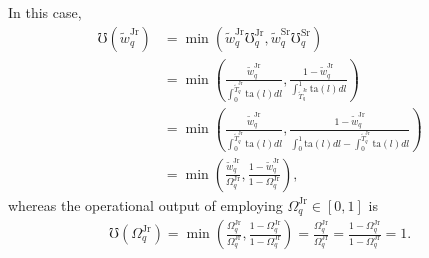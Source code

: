 \documentclass[hidelinks, nonatbib]{elsarticle}
\begin{document}
\begin{enumerate}
    In this case,
    \begin{align}
        \mho(\tilde{w}_{q}^{\text{Jr}})
        &=
        \min\left(
            \tilde{w}_{q}^{\text{Jr}}
            \mho_{q}^{\text{Jr}}
            ,
            \tilde{w}_{q}^{\text{Sr}}
            \mho_{q}^{\text{Sr}}
        \right)
        \\
        &=
        \min\left(
            \frac{
                \tilde{w}_{q}^{\text{Jr}}
            }{
                \int_{0}^{
                    \tilde{T}_{q}^{\text{Jr}}
                }{
                    \text{ta}(l)
                    dl
                }
            }
            ,
            \frac{
                1 - \tilde{w}_{q}^{\text{Jr}}
            }{
                \int_{
                    \tilde{T}_{q}^{\text{Jr}}
                }^{1}{
                    \text{ta}(l)
                    dl
                }
            }
        \right)
        \\
        &=
        \min\left(
            \frac{
                \tilde{w}_{q}^{\text{Jr}}
            }{
                \int_{0}^{
                    \tilde{T}_{q}^{\text{Jr}}
                }{
                    \text{ta}(l)
                    dl
                }
            }
            ,
            \frac{
                1 - \tilde{w}_{q}^{\text{Jr}}
            }{
                \int_{0}^{1}{
                    \text{ta}(l)
                    dl
                }
                -
                \int_{0}^{
                    \tilde{T}_{q}^{\text{Jr}}
                }{
                    \text{ta}(l)
                    dl
                }
            }
        \right)
        \\
        &=
        \min\left(
            \frac{
                \tilde{w}_{q}^{\text{Jr}}
            }{
                \Omega_{q}^{\text{Jr}}
            }
            ,
            \frac{
                1 - \tilde{w}_{q}^{\text{Jr}}
            }{
                1 - \Omega_{q}^{\text{Jr}}
            }
        \right)
        ,
    \end{align}
    whereas the operational output of employing $\Omega_{q}^{\text{Jr}} \in [0,1]$ is
    \begin{align}
        \mho(\Omega_{q}^{\text{Jr}}) 
        =
        \min\left(
            \frac{
                \Omega_{q}^{\text{Jr}}
            }{
                \Omega_{q}^{\text{Jr}}
            }
            ,
            \frac{
                1 - \Omega_{q}^{\text{Jr}}
            }{
                1 - \Omega_{q}^{\text{Jr}}
            }
        \right)
        =
        \frac{
            \Omega_{q}^{\text{Jr}}
        }{
            \Omega_{q}^{\text{Jr}}
        }
        =
        \frac{
            1 - \Omega_{q}^{\text{Jr}}
        }{
            1 - \Omega_{q}^{\text{Jr}}
        }
        =
        1
        .
    \end{align}


\end{enumerate}
\end{document}
